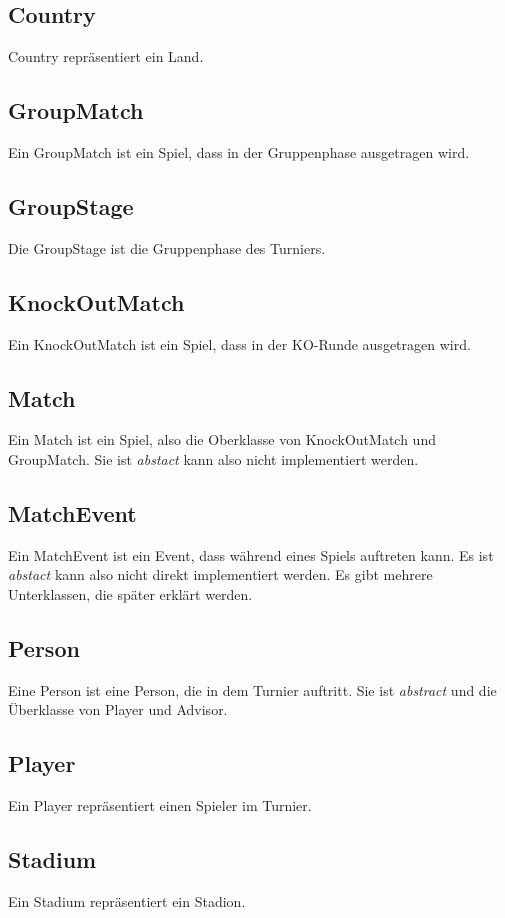 \documentclass[11pt,german]{scrartcl}
\begin{document}
\subsection{Country}
Country repräsentiert ein Land.

\subsection{GroupMatch}
Ein GroupMatch ist ein Spiel, dass in der Gruppenphase ausgetragen wird.

\subsection{GroupStage}
Die GroupStage ist die Gruppenphase des Turniers.

\subsection{KnockOutMatch}
Ein KnockOutMatch ist ein Spiel, dass in der KO-Runde ausgetragen wird.

\subsection{Match}
Ein Match ist ein Spiel, also die Oberklasse von KnockOutMatch und GroupMatch. Sie ist {\it abstact} kann also nicht implementiert werden.

\subsection{MatchEvent}
Ein MatchEvent ist ein Event, dass während eines Spiels auftreten kann. Es ist {\it abstact} kann also nicht direkt implementiert werden.
Es gibt mehrere Unterklassen, die später erklärt werden.

\subsection{Person}
Eine Person ist eine Person, die in dem Turnier auftritt. Sie ist {\it abstract} und die Überklasse von Player und Advisor.

\subsection{Player}
Ein Player repräsentiert einen Spieler im Turnier.

\subsection{Stadium}
Ein Stadium repräsentiert ein Stadion.
\end{document}
